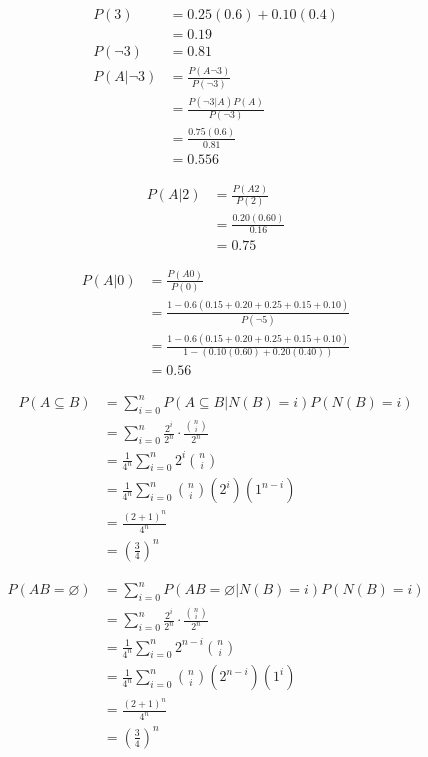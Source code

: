 \documentclass[12pt]{article}
\newenvironment{problem}[2][Problem]{\begin{trivlist}
\item[\hskip \labelsep {\bfseries #1}\hskip \labelsep {\bfseries #2.}]}{\end{trivlist}}
\begin{document}
\begin{problem}{10.c}
\end{problem}
\begin{align*}
	P(3) &= 0.25(0.6) + 0.10(0.4) \\
	&= 0.19 \\
	P(\neg3) &= 0.81 \\
	P(A|\neg3) &= \frac{P(A\neg3)} {P(\neg3)} \\
	&= \frac{P(\neg3|A) P(A)} {P(\neg3)} \\
	&= \frac{0.75(0.6)} {0.81} \\
	&= 0.556
\end{align*}
\filbreak

\begin{problem}{10.d}
\end{problem}
\begin{align*}
	P(A|2) &= \frac{P(A2)} {P(2)} \\
	&= \frac{0.20(0.60)} {0.16} \\
	&= 0.75
\end{align*}
\filbreak

\begin{problem}{10.e}
\end{problem}
\begin{align*}
	P(A|0) &= \frac{P(A0)} {P(0)} \\
	&= \frac{1-0.6(0.15+0.20+0.25+0.15+0.10)} {P(\neg5)} \\
	&= \frac{1-0.6(0.15+0.20+0.25+0.15+0.10)} {1-(0.10(0.60)+0.20(0.40))} \\
	&= 0.56
\end{align*}
\filbreak

\begin{problem}{11.a}
\end{problem}
\begin{align*}
	P(A \subseteq B) &= \sum_{i=0}^{n} P(A \subseteq B|N(B) = i) P(N(B) = i) \\
	&= \sum_{i=0}^{n} \frac{2^i}{2^n} \cdot \frac{\binom{n}{i}} {2^n} \\
	&= \frac{1}{4^n} \sum_{i=0}^{n} 2^i \binom{n}{i} \\
	&= \frac{1}{4^n} \sum_{i=0}^{n} \binom{n}{i} (2^i) (1^{n-i}) \\
	&= \frac{(2+1)^n}{4^n} \\
	&= \left( \frac{3}{4} \right)^n
\end{align*}
\filbreak

\begin{problem}{11.b}
\end{problem}
\begin{align*}
	P(AB = \varnothing) &= \sum_{i=0}^{n} P(AB = \varnothing|N(B) = i) P(N(B) = i) \\
	&= \sum_{i=0}^{n} \frac{2^i}{2^n} \cdot \frac{\binom{n}{i}} {2^n} \\
	&= \frac{1}{4^n} \sum_{i=0}^{n} 2^{n-i} \binom{n}{i} \\
	&= \frac{1}{4^n} \sum_{i=0}^{n} \binom{n}{i} (2^{n-i}) (1^{i}) \\
	&= \frac{(2+1)^n}{4^n} \\
	&= \left( \frac{3}{4} \right)^n
\end{align*}
\filbreak
\end{document}
